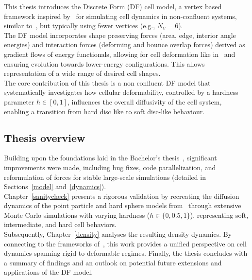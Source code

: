 This thesis introduces the Discrete Form (DF) cell model, a vertex based framework inspired by~\cite{Fletcher14, Boromand2018} for simulating cell dynamics in non-confluent systems, similar to~\cite{Boromand2018}, but typically using fewer vertices (e.g., $N_V=6$). \\
The DF model incorporates shape preserving forces (area, edge, interior angle energies) and interaction forces (deforming and bounce overlap forces) derived as gradient flows of energy functionals, allowing for cell deformation like in~\cite{Boromand2018, Fletcher14,wenzel2021,Happel2023} and ensuring evolution towards lower-energy configurations. 
This allows representation of a wide range of desired cell shapes. \\
The core contribution of this thesis is a non confluent DF model that systematically investigates how cellular deformability, controlled by a hardness parameter $h \in [0,1]$, influences the overall diffusivity of the cell system, enabling a transition from hard disc like to soft disc-like behaviour. 
\subsection{Thesis overview} 
Building upon the foundations laid in the Bachelor's thesis~\cite{Vogel2023}, significant improvements were made, including bug fixes, code parallelization, and reformulation of forces for stable large-scale simulations (detailed in Sections~\ref{model} and~\ref{dynamics}). \\
Chapter~\ref{sanitycheck} presents a rigorous validation by recreating the diffusion dynamics of the point particle and hard sphere models from~\cite{Bruna2012} through extensive Monte Carlo simulations with varying hardness ($h \in \{0, 0.5, 1\}$), representing soft, intermediate, and hard cell behaviors. \\
Subsequently, Chapter~\ref{density} analyses the resulting density dynamics. 
By connecting to the frameworks of~\cite{Bruna2012, Bruna2017, Boromand2018}, this work provides a unified perspective on cell dynamics spanning rigid to deformable regimes. 
Finally, the thesis concludes with a summary of findings and an outlook on potential future extensions and applications of the DF model.
